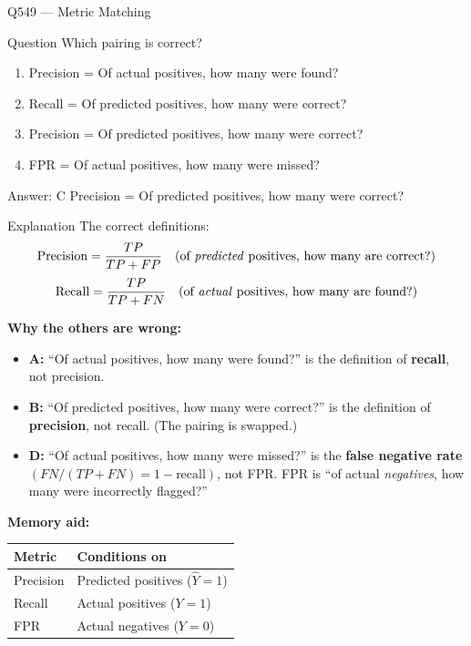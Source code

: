 \documentclass[aspectratio=169,8pt]{beamer}
\begin{document}
	\begin{frame}{Q549 --- Metric Matching}
		\begin{block}{Question}
			Which pairing is correct?
			
			\begin{enumerate}
				\item Precision = Of actual positives, how many were found?
				\item Recall = Of predicted positives, how many were correct?
				\item Precision = Of predicted positives, how many were correct?
				\item FPR = Of actual positives, how many were missed?
			\end{enumerate}
		\end{block}
		
		\begin{exampleblock}{Answer: C}
			Precision = Of predicted positives, how many were correct?
		\end{exampleblock}
		
		\begin{block}{Explanation}
			The correct definitions:
			\[
			\text{Precision} = \frac{TP}{TP + FP} \quad \text{(of \emph{predicted} positives, how many are correct?)}
			\]
			\[
			\text{Recall} = \frac{TP}{TP + FN} \quad \text{(of \emph{actual} positives, how many are found?)}
			\]
			
			\textbf{Why the others are wrong:}
			\begin{itemize}
				\item \textbf{A:} ``Of actual positives, how many were found?'' is the
				definition of \textbf{recall}, not precision.
				\item \textbf{B:} ``Of predicted positives, how many were correct?'' is the
				definition of \textbf{precision}, not recall. (The pairing is swapped.)
				\item \textbf{D:} ``Of actual positives, how many were missed?'' is the
				\textbf{false negative rate} \((FN/(TP+FN) = 1 - \text{recall})\),
				not FPR. FPR is ``of actual \emph{negatives}, how many were
				incorrectly flagged?''
			\end{itemize}
			
			\textbf{Memory aid:}
			\begin{center}
				\begin{tabular}{ll}
					\hline
					\textbf{Metric} & \textbf{Conditions on} \\
					\hline
					Precision & Predicted positives (\(\hat{Y}=1\)) \\
					Recall & Actual positives (\(Y=1\)) \\
					FPR & Actual negatives (\(Y=0\)) \\
					\hline
				\end{tabular}
			\end{center}
		\end{block}
	\end{frame}
	
\end{document}
